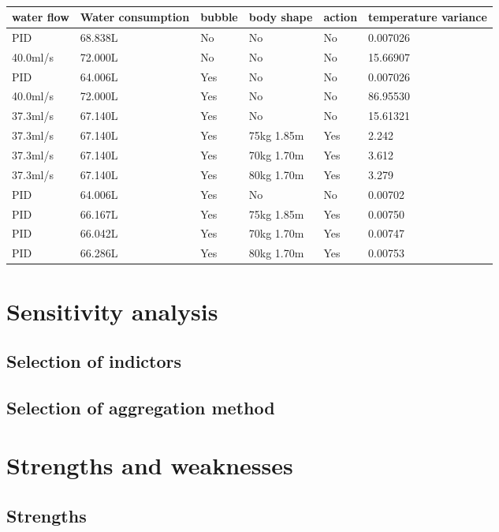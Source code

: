 \documentclass{mcmthesis}
\begin{document}
\begin{table}[H]
	\setlength{\abovecaptionskip}{0pt}
	\setlength{\belowcaptionskip}{0pt}
	\\
	\begin{tabular}{p{2cm}|p{2cm}|p{1.5cm}|p{3cm}|p{1cm}|p{2cm}}
		\hline
		\rowcolor[gray]{0.9}\bf{water flow}	&\bf{Water consumption} &\bf{bubble}&\bf{body shape}&\bf{action}&\bf{temperature variance} \\
		\hline
		PID 	 & 68.838L &No  &No &No &0.007026\\
		40.0ml/s   & 72.000L &No  &No &No &15.66907\\
		\hline
		PID 	 & 64.006L &Yes &No &No &0.007026\\
		40.0ml/s   & 72.000L &Yes &No &No &86.95530\\
		\hline
		37.3ml/s & 67.140L &Yes &No &No &15.61321\\
		37.3ml/s & 67.140L &Yes &75kg 1.85m &Yes &2.242\\	
		37.3ml/s & 67.140L &Yes &70kg 1.70m &Yes &3.612\\
		37.3ml/s & 67.140L &Yes &80kg 1.70m &Yes &3.279\\
		\hline
		PID & 64.006L &Yes &No &No &0.00702\\
		PID & 66.167L &Yes &75kg 1.85m &Yes &0.00750\\	
		PID & 66.042L &Yes &70kg 1.70m &Yes &0.00747\\
		PID & 66.286L &Yes &80kg 1.70m &Yes &0.00753\\
		\hline
	\end{tabular}
\end{table}
\section{Sensitivity analysis}
\subsection{Selection of indictors}%
\subsection{Selection of aggregation method}%
\section{Strengths and weaknesses}
\subsection{Strengths}%
\end{document}
